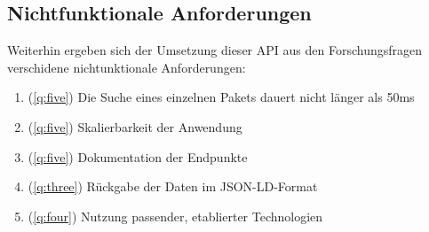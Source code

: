\subsection{Nichtfunktionale Anforderungen} \label{sec:N_Anforderungen}
    Weiterhin ergeben sich der Umsetzung dieser \ac{API} aus den Forschungsfragen verschidene nichtunktionale Anforderungen:
    \begin{enumerate}[label=\textbf{NFRQ-\Roman*}, leftmargin=1cm]
        \item (\ref{q:five}) Die Suche eines einzelnen Pakets dauert nicht länger als 50ms \label{nf:one}
        \item (\ref{q:five}) Skalierbarkeit der Anwendung \label{nf:two}
        \item (\ref{q:five}) Dokumentation der Endpunkte \label{nf:three}
        \item (\ref{q:three}) Rückgabe der Daten im \acs{JSON-LD}-Format \label{nf:four}
        \item (\ref{q:four}) Nutzung passender, etablierter Technologien \label{nf:five}
    \end{enumerate}